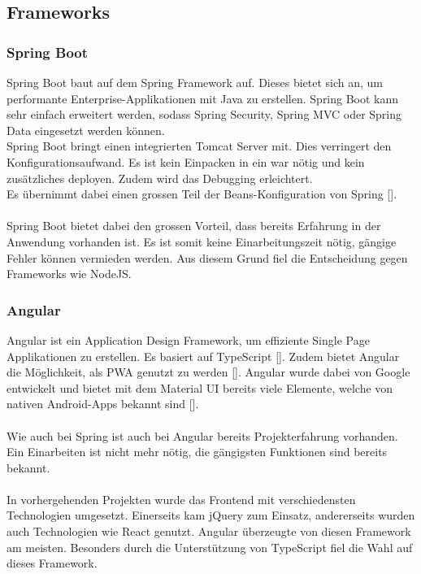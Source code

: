 \subsection{Frameworks}
\subsubsection{\gls{Spring Boot}}
Spring Boot baut auf dem \gls{Spring} Framework auf. Dieses bietet sich an, um performante Enterprise-Applikationen mit Java zu erstellen. Spring Boot kann sehr einfach erweitert werden, sodass Spring Security, Spring MVC oder Spring Data eingesetzt werden können.\\
Spring Boot bringt einen integrierten Tomcat Server mit. Dies verringert den Konfigurationsaufwand. Es ist kein Einpacken in ein \gls{war} nötig und kein zusätzliches deployen. Zudem wird das Debugging erleichtert.  \\
Es übernimmt dabei einen grossen Teil der Beans-Konfiguration von Spring [\cite{springBoot}].\\\\
Spring Boot bietet dabei den grossen Vorteil, dass bereits Erfahrung in der Anwendung vorhanden ist. Es ist somit keine Einarbeitungszeit nötig, gängige Fehler können vermieden werden. Aus diesem Grund fiel die Entscheidung gegen Frameworks wie NodeJS. 

\subsubsection{\gls{Angular}}\label{angularLabel}
Angular ist ein Application Design Framework, um effiziente Single Page Applikationen zu erstellen. Es basiert auf TypeScript [\cite{angular}]. Zudem bietet Angular die Möglichkeit, als \gls{PWA} genutzt zu werden [\cite{angularPWA}]. 
Angular wurde dabei von Google entwickelt und bietet mit dem Material UI bereits viele Elemente, welche von nativen Android-Apps bekannt sind [\cite{angularMaterialUI}]. \\\\
Wie auch bei Spring ist auch bei Angular bereits Projekterfahrung vorhanden. Ein Einarbeiten ist nicht mehr nötig, die gängigsten Funktionen sind bereits bekannt. \\\\
In vorhergehenden Projekten wurde das Frontend mit verschiedensten Technologien umgesetzt. Einerseits kam jQuery zum Einsatz, andererseits wurden auch Technologien wie \gls{React} genutzt. \gls{Angular} überzeugte von diesen Framework am meisten. Besonders durch die Unterstützung von \gls{TypeScript} fiel die Wahl auf dieses Framework. 

